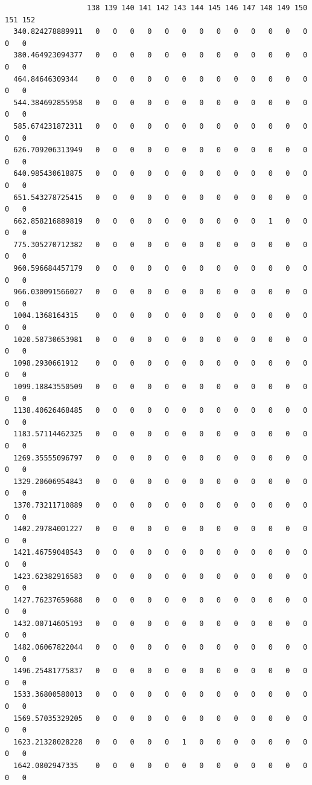 \documentclass[
  letterpaper,
  DIV=11,
  numbers=noendperiod]{scrartcl}
\begin{document}
\begin{verbatim}
                   138 139 140 141 142 143 144 145 146 147 148 149 150 151 152
  340.824278889911   0   0   0   0   0   0   0   0   0   0   0   0   0   0   0
  380.464923094377   0   0   0   0   0   0   0   0   0   0   0   0   0   0   0
  464.84646309344    0   0   0   0   0   0   0   0   0   0   0   0   0   0   0
  544.384692855958   0   0   0   0   0   0   0   0   0   0   0   0   0   0   0
  585.674231872311   0   0   0   0   0   0   0   0   0   0   0   0   0   0   0
  626.709206313949   0   0   0   0   0   0   0   0   0   0   0   0   0   0   0
  640.985430618875   0   0   0   0   0   0   0   0   0   0   0   0   0   0   0
  651.543278725415   0   0   0   0   0   0   0   0   0   0   0   0   0   0   0
  662.858216889819   0   0   0   0   0   0   0   0   0   0   1   0   0   0   0
  775.305270712382   0   0   0   0   0   0   0   0   0   0   0   0   0   0   0
  960.596684457179   0   0   0   0   0   0   0   0   0   0   0   0   0   0   0
  966.030091566027   0   0   0   0   0   0   0   0   0   0   0   0   0   0   0
  1004.1368164315    0   0   0   0   0   0   0   0   0   0   0   0   0   0   0
  1020.58730653981   0   0   0   0   0   0   0   0   0   0   0   0   0   0   0
  1098.2930661912    0   0   0   0   0   0   0   0   0   0   0   0   0   0   0
  1099.18843550509   0   0   0   0   0   0   0   0   0   0   0   0   0   0   0
  1138.40626468485   0   0   0   0   0   0   0   0   0   0   0   0   0   0   0
  1183.57114462325   0   0   0   0   0   0   0   0   0   0   0   0   0   0   0
  1269.35555096797   0   0   0   0   0   0   0   0   0   0   0   0   0   0   0
  1329.20606954843   0   0   0   0   0   0   0   0   0   0   0   0   0   0   0
  1370.73211710889   0   0   0   0   0   0   0   0   0   0   0   0   0   0   0
  1402.29784001227   0   0   0   0   0   0   0   0   0   0   0   0   0   0   0
  1421.46759048543   0   0   0   0   0   0   0   0   0   0   0   0   0   0   0
  1423.62382916583   0   0   0   0   0   0   0   0   0   0   0   0   0   0   0
  1427.76237659688   0   0   0   0   0   0   0   0   0   0   0   0   0   0   0
  1432.00714605193   0   0   0   0   0   0   0   0   0   0   0   0   0   0   0
  1482.06067822044   0   0   0   0   0   0   0   0   0   0   0   0   0   0   0
  1496.25481775837   0   0   0   0   0   0   0   0   0   0   0   0   0   0   0
  1533.36800580013   0   0   0   0   0   0   0   0   0   0   0   0   0   0   0
  1569.57035329205   0   0   0   0   0   0   0   0   0   0   0   0   0   0   0
  1623.21328028228   0   0   0   0   0   1   0   0   0   0   0   0   0   0   0
  1642.0802947335    0   0   0   0   0   0   0   0   0   0   0   0   0   0   0

\end{verbatim}
\end{document}
